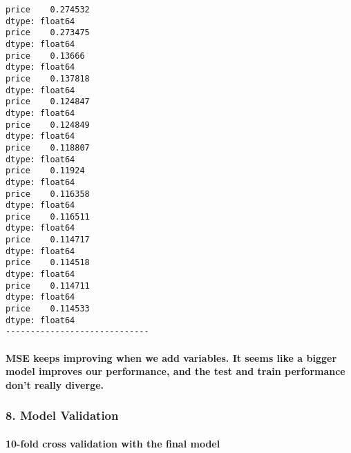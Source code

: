 \documentclass[11pt]{article}
\begin{document}
    \begin{Verbatim}[commandchars=\\\{\}]
price    0.274532
dtype: float64
price    0.273475
dtype: float64
price    0.13666
dtype: float64
price    0.137818
dtype: float64
price    0.124847
dtype: float64
price    0.124849
dtype: float64
price    0.118807
dtype: float64
price    0.11924
dtype: float64
price    0.116358
dtype: float64
price    0.116511
dtype: float64
price    0.114717
dtype: float64
price    0.114518
dtype: float64
price    0.114711
dtype: float64
price    0.114533
dtype: float64
-----------------------------

    \end{Verbatim}

    \paragraph{MSE keeps improving when we add variables. It seems like a
bigger model improves our performance, and the test and train
performance don't really
diverge.}\label{mse-keeps-improving-when-we-add-variables.-it-seems-like-a-bigger-model-improves-our-performance-and-the-test-and-train-performance-dont-really-diverge.}

    \subsubsection{8. Model Validation}\label{model-validation}

\paragraph{10-fold cross validation with the final
model}\label{fold-cross-validation-with-the-final-model}
\end{document}
